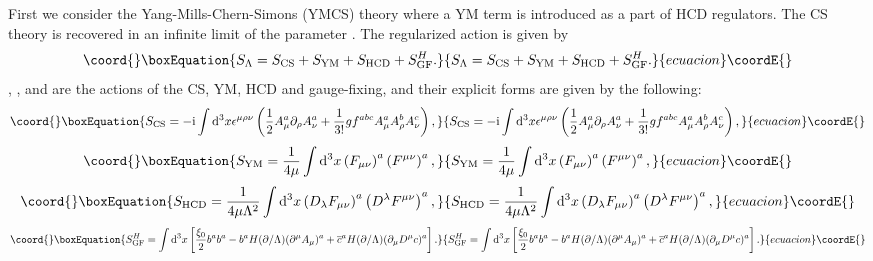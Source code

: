 \documentclass[a4paper,12pt]{article}
\begin{document}
First we consider the Yang-Mills-Chern-Simons (YMCS) theory
where a YM term is introduced as a part of HCD regulators.
%
The CS theory is recovered in an infinite limit of the parameter
\myHighlight{$\mu\rightarrow\infty$}\coordHE{}.
%
The regularized action is given by
%
\begin{equation}\coord{}\boxEquation{
S_\Lambda = S_\mathrm{CS} + S_\mathrm{YM}
 + S_\mathrm{HCD} + S_\mathrm{GF}^H.
\label{eq:regularized YMCS action}
}{
S_\Lambda = S_\mathrm{CS} + S_\mathrm{YM}
 + S_\mathrm{HCD} + S_\mathrm{GF}^H.
}{ecuacion}\coordE{}\end{equation}
%
\coordHE{}, \coordHE{}, \coordHE{} and \coordHE{}
are the actions of the CS, YM, HCD and gauge-fixing,
%
and their explicit forms are given by the following:
%
\begin{equation}\coord{}\boxEquation{
S_\mathrm{CS} =
-\mathrm{i}
\int \mathrm{d}^3 x 
\epsilon^{\mu\rho\nu}
\left(
\frac{1}{2}A_\mu^a \partial_\rho A_\nu^a
+\frac{1}{3!}gf^{abc}A_\mu^a A_\rho^b A_\nu^c
\right),
\label{eq:CS action}
}{
S_\mathrm{CS} =
-\mathrm{i}
\int \mathrm{d}^3 x 
\epsilon^{\mu\rho\nu}
\left(
\frac{1}{2}A_\mu^a \partial_\rho A_\nu^a
+\frac{1}{3!}gf^{abc}A_\mu^a A_\rho^b A_\nu^c
\right),
}{ecuacion}\coordE{}\end{equation}
%
\begin{equation}\coord{}\boxEquation{
S_\mathrm{YM} =
\frac{1}{ 4\mu}
\int \mathrm{d}^3 x 
\left( F_{\mu\nu} \right)^a
\left( F^{\mu\nu} \right)^a,
\label{eq:YM action}
}{
S_\mathrm{YM} =
\frac{1}{ 4\mu}
\int \mathrm{d}^3 x 
\left( F_{\mu\nu} \right)^a
\left( F^{\mu\nu} \right)^a,
}{ecuacion}\coordE{}\end{equation}
%
\begin{equation}\coord{}\boxEquation{
S_\mathrm{HCD} =
\frac{1}{ 4\mu \Lambda^2}
\int \mathrm{d}^3 x 
\left( D_\lambda F_{\mu\nu} \right)^a
\left( D^\lambda F^{\mu\nu} \right)^a,
\label{eq:HCD action}
}{
S_\mathrm{HCD} =
\frac{1}{ 4\mu \Lambda^2}
\int \mathrm{d}^3 x 
\left( D_\lambda F_{\mu\nu} \right)^a
\left( D^\lambda F^{\mu\nu} \right)^a,
}{ecuacion}\coordE{}\end{equation}
%
\begin{equation}\coord{}\boxEquation{
S_\mathrm{GF}^H =
\int \mathrm{d}^3 x
\left[
 \frac{\xi_0 }{ 2} b^a b^a
 -
 b^a H(\partial/\Lambda) (\partial^\mu A_\mu)^a
 +
 \overline c^a H(\partial/\Lambda) 
 (\partial_\mu D^\mu c)^a
\right].
\label{eq:GF action}
}{
S_\mathrm{GF}^H =
\int \mathrm{d}^3 x
\left[
 \frac{\xi_0 }{ 2} b^a b^a
 -
 b^a H(\partial/\Lambda) (\partial^\mu A_\mu)^a
 +
 \overline c^a H(\partial/\Lambda) 
 (\partial_\mu D^\mu c)^a
\right].
}{ecuacion}\coordE{}\end{equation}
\end{document}
